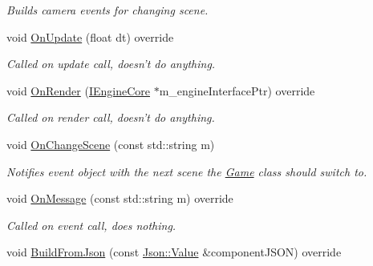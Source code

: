 \begin{DoxyCompactItemize}
\begin{DoxyCompactList}\small\item\em Builds camera events for changing scene. \end{DoxyCompactList}\item 
\hypertarget{class_event_camera_component_aa834641aeb7cc8ae509f6cc997a44c99}{void \hyperlink{class_event_camera_component_aa834641aeb7cc8ae509f6cc997a44c99}{On\+Update} (float dt) override}\label{class_event_camera_component_aa834641aeb7cc8ae509f6cc997a44c99}

\begin{DoxyCompactList}\small\item\em Called on update call, doesn't do anything. \end{DoxyCompactList}\item 
\hypertarget{class_event_camera_component_a88ef296a079e3021d756ef03c56cfe70}{void \hyperlink{class_event_camera_component_a88ef296a079e3021d756ef03c56cfe70}{On\+Render} (\hyperlink{class_i_engine_core}{I\+Engine\+Core} $\ast$m\+\_\+engine\+Interface\+Ptr) override}\label{class_event_camera_component_a88ef296a079e3021d756ef03c56cfe70}

\begin{DoxyCompactList}\small\item\em Called on render call, doesn't do anything. \end{DoxyCompactList}\item 
\hypertarget{class_event_camera_component_a2eb23cc4f6598a99afacf89d999476e2}{void \hyperlink{class_event_camera_component_a2eb23cc4f6598a99afacf89d999476e2}{On\+Change\+Scene} (const std\+::string m)}\label{class_event_camera_component_a2eb23cc4f6598a99afacf89d999476e2}

\begin{DoxyCompactList}\small\item\em Notifies event object with the next scene the \hyperlink{class_game}{Game} class should switch to. \end{DoxyCompactList}\item 
\hypertarget{class_event_camera_component_a0de9c713b1c9cbb98b8528080fb81adb}{void \hyperlink{class_event_camera_component_a0de9c713b1c9cbb98b8528080fb81adb}{On\+Message} (const std\+::string m) override}\label{class_event_camera_component_a0de9c713b1c9cbb98b8528080fb81adb}

\begin{DoxyCompactList}\small\item\em Called on event call, does nothing. \end{DoxyCompactList}\item 
\hypertarget{class_event_camera_component_a47edd4b0e80549fa677b3ff02465e62e}{void \hyperlink{class_event_camera_component_a47edd4b0e80549fa677b3ff02465e62e}{Build\+From\+Json} (const \hyperlink{class_json_1_1_value}{Json\+::\+Value} \&component\+J\+S\+O\+N) override}\label{class_event_camera_component_a47edd4b0e80549fa677b3ff02465e62e}


\end{DoxyCompactItemize}
